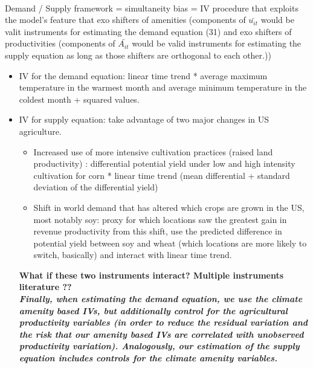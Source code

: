 \documentclass[12pt, final]{article}
\begin{document}
\\
Demand / Supply framework = simultaneity bias = IV procedure that exploits the model's feature that exo shifters of amenities (components of $\bar{u_{it}}$ would be valit instruments for estimating the demand equation (31) and exo shifters of productivities (components of $\bar{A_{it}}$ would be valid instruments for estimating the supply equation as long as those shifters are orthogonal to each other.))
\\
\begin{itemize}
    \item IV for the demand equation: linear time trend * average maximum temperature in the warmest month and average minimum temperature in the coldest month + squared values.
    \item IV for supply equation: take advantage of two major changes in US agriculture. 
    \begin{itemize}
        \item Increased use of more intensive cultivation practices (raised land productivity) : differential potential yield under low and high intensity cultivation for corn * linear time trend (mean differential + standard deviation of the differential yield)
        \item Shift in world demand that has altered which crops are grown in the US, most notably soy: proxy for which locations saw the greatest gain in revenue productivity from this shift, use the predicted difference in potential yield between soy and wheat (which locations are more likely to switch, basically) and interact with linear time trend.
    \end{itemize}
    \textbf{What if these two instruments interact? Multiple instruments literature ??}
    \\
    \textbf{\textit{Finally, when estimating the demand equation, we use the climate amenity based IVs, but additionally control for the agricultural productivity variables (in order to reduce the residual variation and the risk that our amenity based IVs are correlated with unobserved productivity variation). Analogously, our estimation of the supply equation includes controls for the climate amenity variables.}}
\end{itemize}
\end{document}
